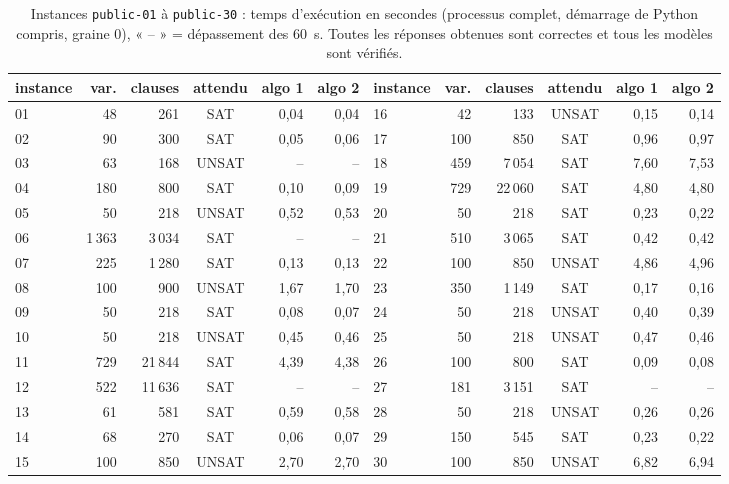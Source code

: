 \documentclass[11pt,a4paper]{article}
\begin{document}
\begin{table}[h]
  \centering\small\setlength{\tabcolsep}{4pt}
  \begin{tabular}{lrrcrr@{\qquad}lrrcrr}
    \toprule
    instance & var. & clauses & attendu & algo 1 & algo 2 &
    instance & var. & clauses & attendu & algo 1 & algo 2\\
    \midrule
    01 &   48 &    261 & SAT   &  0,04 &  0,04 & 16 &   42 &    133 & UNSAT &  0,15 &  0,14\\
    02 &   90 &    300 & SAT   &  0,05 &  0,06 & 17 &  100 &    850 & SAT   &  0,96 &  0,97\\
    03 &   63 &    168 & UNSAT &    -- &    -- & 18 &  459 &  7\,054 & SAT   &  7,60 &  7,53\\
    04 &  180 &    800 & SAT   &  0,10 &  0,09 & 19 &  729 & 22\,060 & SAT   &  4,80 &  4,80\\
    05 &   50 &    218 & UNSAT &  0,52 &  0,53 & 20 &   50 &    218 & SAT   &  0,23 &  0,22\\
    06 & 1\,363 & 3\,034 & SAT &    -- &    -- & 21 &  510 &  3\,065 & SAT   &  0,42 &  0,42\\
    07 &  225 &  1\,280 & SAT   &  0,13 &  0,13 & 22 &  100 &    850 & UNSAT &  4,86 &  4,96\\
    08 &  100 &    900 & UNSAT &  1,67 &  1,70 & 23 &  350 &  1\,149 & SAT   &  0,17 &  0,16\\
    09 &   50 &    218 & SAT   &  0,08 &  0,07 & 24 &   50 &    218 & UNSAT &  0,40 &  0,39\\
    10 &   50 &    218 & UNSAT &  0,45 &  0,46 & 25 &   50 &    218 & UNSAT &  0,47 &  0,46\\
    11 &  729 & 21\,844 & SAT   &  4,39 &  4,38 & 26 &  100 &    800 & SAT   &  0,09 &  0,08\\
    12 &  522 & 11\,636 & SAT   &    -- &    -- & 27 &  181 &  3\,151 & SAT   &    -- &    --\\
    13 &   61 &    581 & SAT   &  0,59 &  0,58 & 28 &   50 &    218 & UNSAT &  0,26 &  0,26\\
    14 &   68 &    270 & SAT   &  0,06 &  0,07 & 29 &  150 &    545 & SAT   &  0,23 &  0,22\\
    15 &  100 &    850 & UNSAT &  2,70 &  2,70 & 30 &  100 &    850 & UNSAT &  6,82 &  6,94\\
    \bottomrule
  \end{tabular}
  \caption{Instances \texttt{public-01} à \texttt{public-30} : temps d'exécution en secondes
  (processus complet, démarrage de Python compris, graine 0), « -- » = dépassement des 60~s.
  Toutes les réponses obtenues sont correctes et tous les modèles sont vérifiés.}
  \label{tab:public}
\end{table}
\end{document}
